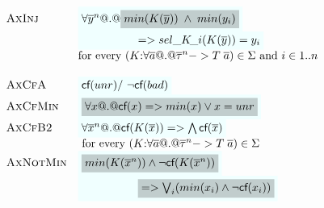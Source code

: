 \documentclass[preprint,nocopyrightspace,draft]{sigplanconf}
\begin{document}
{\[\begin{array}{c}
\begin{array}{lll}
 \textsc{AxInj}   & \formula{\forall \oln{y}{n} @.@ \highlight{min(K(\ys))\;\land\; min(y_i)}} \\ 
                  & \formula{\quad\qquad\qquad => \sel{K}{i}(K(\ys)) = y_i} \\ 
                  & \text{for every } (K{:}\forall\as @.@ \oln{\tau}{n} -> T\;\as) \in \Sigma \text{ and } i \in 1..n \\ \\

 \textsc{AxCfA}    & \formula{\lcf{\unr} /\ \lncf{\bad}} \\
 \textsc{AxCfMin}  & \formula{\highlight{\forall x @.@ \lcf{x} => min(x) \lor x = unr}} \\
 \textsc{AxCfB2}   & \formula{\forall \oln{x}{n} @.@ \lcf{K(\ol{x})}  => \bigwedge\lcf{\ol{x}}} \\
                   & \text{ for every } (K{:}\forall\as @.@ \oln{\tau}{n} -> T\;\as) \in \Sigma \\
 \textsc{AxNotMin} & \formula{\highlight{min(K(\oln{x}{n}))\land\neg\lcf{K(\oln{x}{n})}}} \\ 
                   & \formula{\quad\qquad\qquad \highlight{ => \bigvee_i (min(x_i)\land\neg\lcf{x_i})}}
\end{array}
\end{array}\]}
\end{document}
